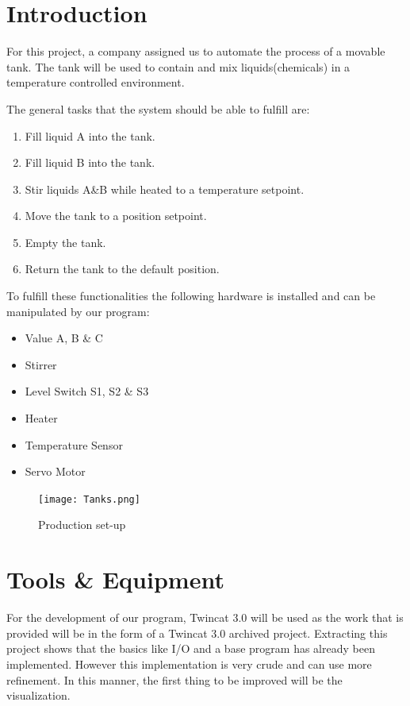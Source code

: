 \documentclass[11pt]{essayStyle} %
\begin{document}

\section{Introduction}

For this project, a company assigned us to automate the process of a movable tank. The tank will be used to contain and mix liquids(chemicals) in a temperature controlled environment. 

The general tasks that the system should be able to fulfill are:
\begin{enumerate}
	\item Fill liquid A into the tank.
	\item Fill liquid B into the tank.
	\item Stir liquids A\&B while heated to a temperature setpoint.
	\item Move the tank to a position setpoint.
	\item Empty the tank.
	\item Return the tank to the default position.
\end{enumerate}


To fulfill these functionalities the following hardware is installed and can be manipulated by our program:
\begin{itemize}
	\item Value A, B \& C
	\item Stirrer
	\item Level Switch S1, S2 \& S3
	\item Heater
	\item Temperature Sensor
	\item Servo Motor
\end{itemize}

\begin{figure}[h]
	\texttt{[image: Tanks.png]}
	\caption{Production set-up}
\end{figure}


\section{Tools \& Equipment}
For the development of our program, Twincat 3.0 will be used as the work that is provided will be in the form of a Twincat 3.0 archived project. Extracting this project shows that the basics like I/O and a base program has already been implemented. However this implementation is very crude and can use more refinement. In this manner, the first thing to be improved will be the visualization. 
\end{document}
